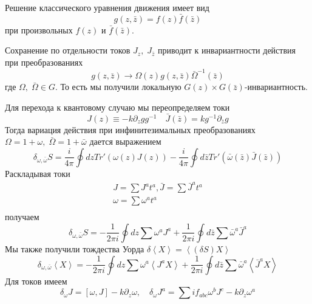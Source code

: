 \documentclass[a4paper,12pt]{article}
\theoremstyle{definition} \newtheorem{Def}{Definition}
\begin{document}
Решение классического уравнения движения имеет вид
\begin{equation}
  \label{eq:80}
  g(z,\bar z)=f(z)\bar f(\bar z)
\end{equation}
при произвольных $f(z)$ и $\bar f (\bar z)$.

Сохранение по отдельности токов $J_z,\; J_{\bar z}$ приводит к инвариантности действия при преобразованиях
\begin{equation}
  \label{eq:81}
   g(z,\bar z)\to \Omega(z)g(z,\bar z)\bar \Omega^{-1}(\bar z)
\end{equation}
где $\Omega,\;\bar \Omega \in G$. То есть мы получили локальную $G(z)\times G(\bar z)$-инвариантность.

Для перехода к квантовому случаю мы переопределяем токи
\begin{equation}
  \label{eq:82}
  J(z)\equiv -k \partial_zg g^{-1}\quad \bar J(\bar z)=k g^{-1}\partial_{\bar z}g
\end{equation}
Тогда вариация действия при инфинитезимальных преобразованиях $\Omega=1+\omega,\; \bar \Omega =1+\bar \omega$ дается выражением
\begin{equation}
  \label{eq:83}
  \delta_{\omega,\bar\omega}S=\frac{i}{4\pi}\oint dz Tr' (\omega(z)J(z))-\frac{i}{4\pi}\oint d\bar z Tr'(\bar\omega(\bar z)\bar J(\bar z))
\end{equation}
Раскладывая токи
\begin{equation}
  \label{eq:85}
  \begin{aligned}
    J=\sum J^a t^a,\bar J=\sum \bar J^a t^a \\
    \omega=\sum \omega^a t^a\\
  \end{aligned}
\end{equation}
получаем
\begin{equation}
  \label{eq:86}
  \delta_{\omega,\bar \omega}S=-\frac{1}{2\pi i}\oint dz \sum\omega^a J^a+\frac{1}{2\pi i} \oint d\bar z \sum \bar \omega^a \bar J^a
\end{equation}
Мы также получили тождества Уорда $\delta\left< X\right>=\left<(\delta S)X\right>$
\begin{equation}
  \label{eq:87}
  \delta_{\omega,\bar \omega}\left< X \right>=-\frac{1}{2\pi i}\oint dz \sum\omega^a \left< J^a X\right>+
  \frac{1}{2\pi i} \oint d\bar z \sum \bar \omega^a \left< \bar J^a X\right>
\end{equation}
Для токов имеем
\begin{equation}
  \label{eq:88}
  \delta_{\omega}J=[\omega,J]-k\partial_z\omega,\quad \delta_{\omega}J^a=\sum i f_{abc}\omega^b J^c-k\partial_z\omega^a
\end{equation}
\end{document}
